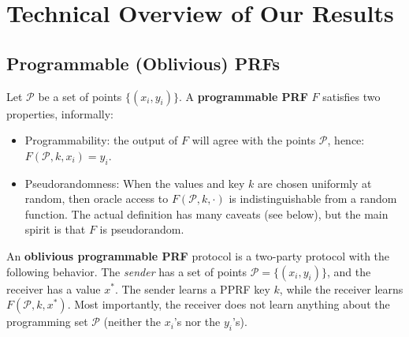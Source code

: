 \section{Technical Overview of Our Results}
\label{sect:overview}

\subsection{Programmable (Oblivious) PRFs}

\renewcommand{\P}{\mathcal{P}}

Let $\P$ be a set of points $\{ (x_i, y_i) \}$. A {\bf programmable PRF} $F$ satisfies two properties, informally:
\begin{itemize}
    \item Programmability: the output of $F$ will agree with the points $\P$, hence: $F(\P,k, x_i) = y_i$.
    \item Pseudorandomness: When the  values and key $k$ are chosen uniformly at random, then oracle access to $F(\P,k, \cdot)$ is indistinguishable from a random function. The actual definition has many caveats (see below), but the main spirit is that $F$ is pseudorandom.
\end{itemize}

An {\bf oblivious programmable PRF} protocol is a two-party protocol with the following behavior. The {\em sender} has a set of points $\P = \{ (x_i, y_i) \}$, and the receiver has a value $x^*$. The sender learns a PPRF key $k$, while the receiver learns $F(\P,k,x^*)$. Most importantly, the receiver does not learn anything about the programming set $\P$ (neither the $x_i$'s nor the $y_i$'s).

